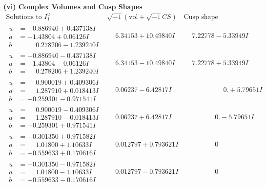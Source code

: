 \documentclass[1p]{elsarticle_modified}
\theoremstyle{definition}
\newcommand{\I}{\sqrt{-1}}
\begin{document}
\newpage\flushleft \textbf{(vi) Complex Volumes and Cusp Shapes}
$$\begin{array}{c|c|c}  
\text{Solutions to }I^u_{1}& \I (\text{vol} + \sqrt{-1}CS) & \text{Cusp shape}\\
 \hline 
\begin{aligned}
u &= -0.886940 + 0.437138 I \\
a &= -1.43804 + 0.06126 I \\
b &= \phantom{-}0.278206 - 1.239240 I\end{aligned}
 & \phantom{-}6.34153 + 10.49840 I & \phantom{-}7.22778 - 5.33949 I \\ \hline\begin{aligned}
u &= -0.886940 - 0.437138 I \\
a &= -1.43804 - 0.06126 I \\
b &= \phantom{-}0.278206 + 1.239240 I\end{aligned}
 & \phantom{-}6.34153 - 10.49840 I & \phantom{-}7.22778 + 5.33949 I \\ \hline\begin{aligned}
u &= \phantom{-}0.900019 + 0.409306 I \\
a &= \phantom{-}1.287910 + 0.018413 I \\
b &= -0.259301 - 0.971541 I\end{aligned}
 & \phantom{-}0.06237 - 6.42817 I & \phantom{-0.000000 -}0. + 5.79651 I \\ \hline\begin{aligned}
u &= \phantom{-}0.900019 - 0.409306 I \\
a &= \phantom{-}1.287910 - 0.018413 I \\
b &= -0.259301 + 0.971541 I\end{aligned}
 & \phantom{-}0.06237 + 6.42817 I & \phantom{-0.000000 } 0. - 5.79651 I \\ \hline\begin{aligned}
u &= -0.301350 + 0.971582 I \\
a &= \phantom{-}1.01800 + 1.10633 I \\
b &= -0.559633 + 0.170616 I\end{aligned}
 & \phantom{-}0.012797 + 0.793621 I & \phantom{-0.000000 } 0 \\ \hline\begin{aligned}
u &= -0.301350 - 0.971582 I \\
a &= \phantom{-}1.01800 - 1.10633 I \\
b &= -0.559633 - 0.170616 I\end{aligned}
 & \phantom{-}0.012797 - 0.793621 I & \phantom{-0.000000 } 0 \\ \hline\begin{aligned}

\end{aligned}
\end{array}$$
\end{document}
